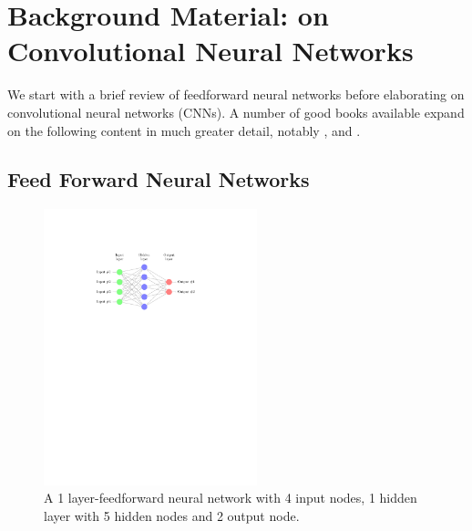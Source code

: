 \chapter{Background Material: on Convolutional Neural Networks}

\noindent We start with a brief review of feedforward neural networks before elaborating on convolutional neural networks (CNNs). A number of good books available expand on the following content in much greater detail, notably \citep{Bengio-et-al-2015-Book}, \citep{Bishop:1995:NNP:525960} and \citep{Nielsen}.

\section{Feed Forward Neural Networks}

\begin{figure}
\centering
\includegraphics[trim=4cm 17cm 3cm 4cm, clip=true, height=80mm]{Tikz/NN.pdf}
\caption{A 1 layer-feedforward neural network with 4 input nodes, 1 hidden layer with 5 hidden nodes and 2 output node.}
\label{Basic_neural_network}
\end{figure}

